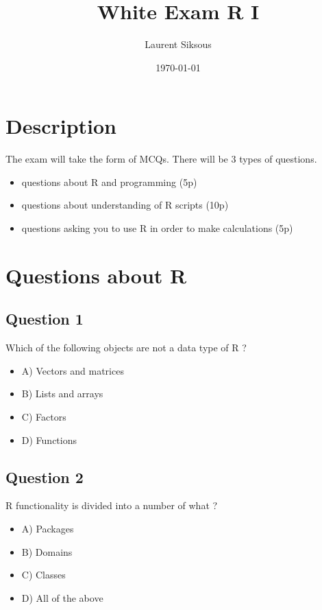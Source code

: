 \documentclass[11pt]{article}
\author{Laurent Siksous}
\date{\today}
\title{White Exam R I}
\begin{document}
\maketitle

\section*{Description}
\label{sec:org87793da}
The exam will take the form of MCQs. There will be 3 types of questions.

\begin{itemize}
\item questions about R and programming (5p)

\item questions about understanding of R scripts (10p)

\item questions asking you to use R in order to make calculations (5p)
\end{itemize}

\section*{Questions about R}
\label{sec:orge5bf8c8}
\subsection*{Question 1}
\label{sec:org2191168}
Which of the following objects are not a data type of R ?

\begin{itemize}
\item A) Vectors and matrices

\item B) Lists and arrays

\item C) Factors

\item D) Functions
\end{itemize}

\subsection*{Question 2}
\label{sec:org1b74db9}
R functionality is divided into a number of what ?

\begin{itemize}
\item A) Packages

\item B) Domains

\item C) Classes

\item D) All of the above
\end{itemize}
\end{document}
